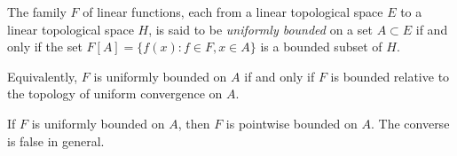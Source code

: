 The family $F$ of linear functions, each from a linear topological space $E$ to a linear topological space $H$, is said to be \emph{uniformly bounded} on a set $A \subset E$ if and only if the set $F[A] = \{f(x) : f \in F, x \in A\}$ is a bounded subset of $H$.

Equivalently, $F$ is uniformly bounded on $A$ if and only if $F$ is bounded relative to the topology of uniform convergence on $A$.

If $F$ is uniformly bounded on $A$, then $F$ is pointwise bounded on $A$. The converse is false in general.

